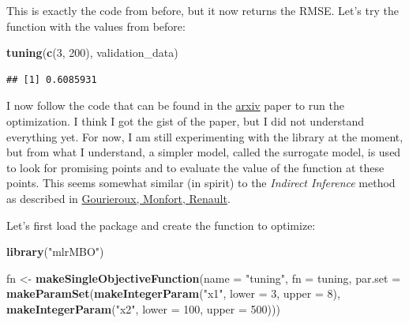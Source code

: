 \documentclass[]{gitbook}
\newenvironment{Shaded}{\begin{snugshade}}{\end{snugshade}}
\newcommand{\DataTypeTok}[1]{\textcolor[rgb]{0.13,0.29,0.53}{#1}}
\newcommand{\DecValTok}[1]{\textcolor[rgb]{0.00,0.00,0.81}{#1}}
\newcommand{\KeywordTok}[1]{\textcolor[rgb]{0.13,0.29,0.53}{\textbf{#1}}}
\newcommand{\NormalTok}[1]{#1}
\newcommand{\StringTok}[1]{\textcolor[rgb]{0.31,0.60,0.02}{#1}}
\begin{document}
This is exactly the code from before, but it now returns the RMSE. Let's try the function
with the values from before:

\begin{Shaded}
\begin{Highlighting}[]
\KeywordTok{tuning}\NormalTok{(}\KeywordTok{c}\NormalTok{(}\DecValTok{3}\NormalTok{, }\DecValTok{200}\NormalTok{), validation_data)}
\end{Highlighting}
\end{Shaded}

\begin{verbatim}
## [1] 0.6085931
\end{verbatim}

I now follow the code that can be found in the \href{https://arxiv.org/abs/1703.03373}{arxiv} paper to
run the optimization. I think I got the gist of the paper, but I did not understand everything yet.
For now, I am still experimenting with the library at the moment, but from what I understand, a
simpler model, called the surrogate model, is used to look for promising points and to evaluate the
value of the function at these points. This seems somewhat similar (in spirit) to the
\emph{Indirect Inference} method as described in \href{https://www.jstor.org/stable/2285076}{Gourieroux, Monfort, Renault}.

Let's first load the package and create the function to optimize:

\begin{Shaded}
\begin{Highlighting}[]
\KeywordTok{library}\NormalTok{(}\StringTok{"mlrMBO"}\NormalTok{)}
\end{Highlighting}
\end{Shaded}

\begin{Shaded}
\begin{Highlighting}[]
\NormalTok{fn <-}\StringTok{ }\KeywordTok{makeSingleObjectiveFunction}\NormalTok{(}\DataTypeTok{name =} \StringTok{"tuning"}\NormalTok{,}
                                 \DataTypeTok{fn =}\NormalTok{ tuning,}
                                 \DataTypeTok{par.set =} \KeywordTok{makeParamSet}\NormalTok{(}\KeywordTok{makeIntegerParam}\NormalTok{(}\StringTok{"x1"}\NormalTok{, }\DataTypeTok{lower =} \DecValTok{3}\NormalTok{, }\DataTypeTok{upper =} \DecValTok{8}\NormalTok{),}
                                                        \KeywordTok{makeIntegerParam}\NormalTok{(}\StringTok{"x2"}\NormalTok{, }\DataTypeTok{lower =} \DecValTok{100}\NormalTok{, }\DataTypeTok{upper =} \DecValTok{500}\NormalTok{)))}
\end{Highlighting}
\end{Shaded}
\end{document}
